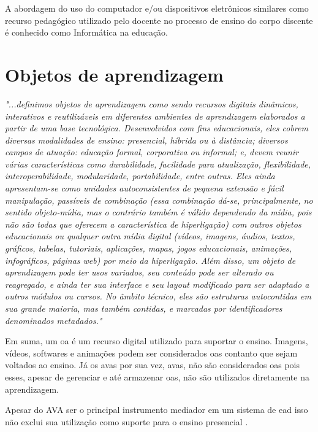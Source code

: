 A abordagem do uso do computador e/ou dispositivos eletrônicos similares como recurso pedagógico utilizado pelo docente no processo de ensino do corpo discente é conhecido como Informática na educação. \cite{kenski07}

\section{Objetos de aprendizagem}
\label{sec:objetosaprendizagem}

\textit{"...definimos objetos de aprendizagem como sendo recursos digitais dinâmicos, interativos e reutilizáveis em diferentes ambientes de aprendizagem elaborados a partir de uma base tecnológica. Desenvolvidos com fins educacionais, eles cobrem diversas modalidades de ensino: presencial, híbrida ou à distância; diversos campos de atuação: educação formal, corporativa ou informal; e, devem reunir várias características como durabilidade, facilidade para atualização, flexibilidade, interoperabilidade, modularidade, portabilidade, entre outras. Eles ainda apresentam-se como unidades autoconsistentes de pequena extensão e fácil manipulação, passíveis de combinação (essa combinação dá-se, principalmente, no sentido objeto-mídia, mas o contrário também é válido dependendo da mídia, pois não são todas que oferecem a característica de hiperligação) com outros objetos educacionais ou qualquer outra mídia digital (vídeos, imagens, áudios, textos, gráficos, tabelas, tutoriais, aplicações, mapas, jogos educacionais, animações, infográficos, páginas web) por meio da hiperligação. Além disso, um objeto de aprendizagem pode ter usos variados, seu conteúdo pode ser alterado ou reagregado, e ainda ter sua interface e seu layout modificado para ser adaptado a outros módulos ou cursos. No âmbito técnico, eles são estruturas autocontidas em sua grande maioria, mas também contidas, e marcadas por identificadores denominados metadados."} \cite{audino12}

Em suma, um \acrfull{oa} é um recurso digital utilizado para suportar o ensino. Imagens, vídeos, softwares e animações podem ser considerados \acrshort{oa}s contanto que sejam voltados ao ensino. Já os \acrshort{avas} por sua vez, \acrlong{avas}, não são considerados \acrshort{oa}s pois esses, apesar de gerenciar e até armazenar \acrshort{oa}s, não são utilizados diretamente na aprendizagem. \cite{wiley02} \cite{braga14}

Apesar do AVA ser o principal instrumento mediador em um sistema de \acrfull{ead} isso não exclui sua utilização como suporte para o ensino presencial \cite{belmonte10}.

